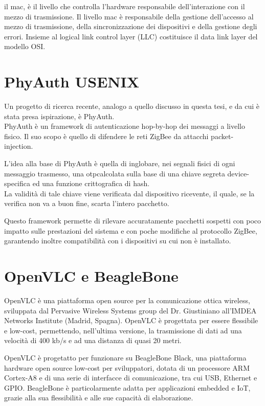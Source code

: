 il \gls{mac}, è il livello che controlla l'hardware responsabile dell'interazione con il mezzo di trasmissione. Il livello \gls{mac} è responsabile della gestione dell'accesso al mezzo di trasmissione, della sincronizzazione dei dispositivi e della gestione degli errori. Insieme al logical link control layer (LLC) costituisce il data link layer del modello OSI.

\section{PhyAuth USENIX}
Un progetto di ricerca recente, analogo a quello discusso in questa tesi, e da cui è stata presa ispirazione, è PhyAuth.\\
PhyAuth è un framework di autenticazione hop-by-hop dei messaggi a livello fisico. Il suo scopo è quello di difendere le reti ZigBee da attacchi packet-injection.

L'idea alla base di PhyAuth è quella di inglobare, nei segnali fisici di ogni messaggio trasmesso, una \gls{otp}\glsfirstoccur calcolata sulla base di una chiave segreta device-specifica ed una funzione crittografica di hash.\\
La validità di tale chiave viene verificata dal dispositivo ricevente, il quale, se la verifica non va a buon fine, scarta l'intero pacchetto.

Questo framework permette di rilevare accuratamente pacchetti sospetti con poco impatto sulle prestazioni del sistema e con poche modifiche al protocollo ZigBee, garantendo inoltre compatibilità con i dispositivi su cui non è installato.

\section{OpenVLC e BeagleBone}
OpenVLC è una piattaforma open source per la comunicazione ottica wireless, sviluppata dal Pervasive Wireless Systems group del Dr. Giustiniano all'IMDEA Networks Institute (Madrid, Spagna).
OpenVLC è progettata per essere flessibile e low-cost, permettendo, nell'ultima versione, la trasmissione di dati ad una velocità di 400 kb/s e ad una distanza di quasi 20 metri.

OpenVLC è progetatto per funzionare su BeagleBone Black, una piattaforma hardware open source low-cost per sviluppatori, dotata di un processore ARM Cortex-A8 e di una serie di interfacce di comunicazione, tra cui USB, Ethernet e GPIO. BeagleBone è particolarmente adatta per applicazioni embedded e IoT, grazie alla sua flessibilità e alle sue capacità di elaborazione.
